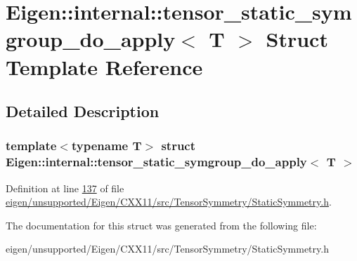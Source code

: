 \hypertarget{struct_eigen_1_1internal_1_1tensor__static__symgroup__do__apply}{}\section{Eigen\+:\+:internal\+:\+:tensor\+\_\+static\+\_\+symgroup\+\_\+do\+\_\+apply$<$ T $>$ Struct Template Reference}
\label{struct_eigen_1_1internal_1_1tensor__static__symgroup__do__apply}


\subsection{Detailed Description}
\subsubsection*{template$<$typename T$>$\newline
struct Eigen\+::internal\+::tensor\+\_\+static\+\_\+symgroup\+\_\+do\+\_\+apply$<$ T $>$}



Definition at line \hyperlink{eigen_2unsupported_2_eigen_2_c_x_x11_2src_2_tensor_symmetry_2_static_symmetry_8h_source_l00137}{137} of file \hyperlink{eigen_2unsupported_2_eigen_2_c_x_x11_2src_2_tensor_symmetry_2_static_symmetry_8h_source}{eigen/unsupported/\+Eigen/\+C\+X\+X11/src/\+Tensor\+Symmetry/\+Static\+Symmetry.\+h}.



The documentation for this struct was generated from the following file\+:\begin{DoxyCompactItemize}
\item 
eigen/unsupported/\+Eigen/\+C\+X\+X11/src/\+Tensor\+Symmetry/\+Static\+Symmetry.\+h\end{DoxyCompactItemize}
